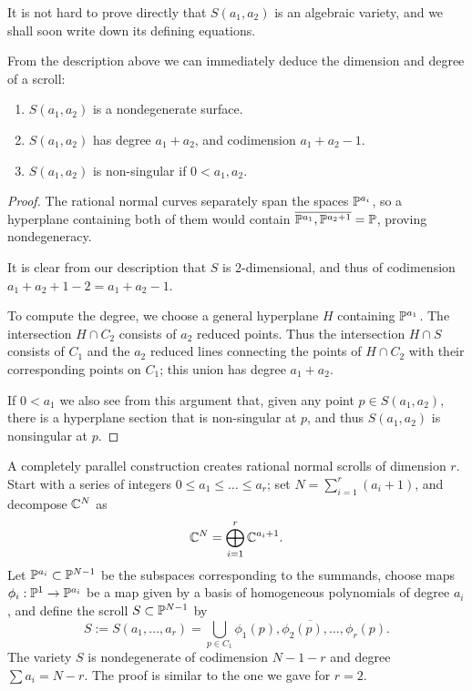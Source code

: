 It is not hard to prove directly that $S(a_1,a_2)$ is an algebraic variety, and we shall soon write down its defining equations.



From the description above we can immediately deduce the dimension and degree of a scroll:

\begin{proposition}
\begin{enumerate}
\item $S(a_1,a_2)$ is a nondegenerate surface.
 \item $S(a_1,a_2)$ has degree $a_1+a_2$, and codimension $a_1+a_2-1.$
 \item $S(a_{1},a_{2})$ is non-singular if $0<a_{1}, a_{2}$.
 \end{enumerate}
\end{proposition}\label{deg and codim}

\begin{proof}
 The rational normal curves separately span the spaces ${\mathbb P}^{a_i}$, so a hyperplane containing both of them would contain $\overline{{\mathbb P}^{a_1}, {\mathbb P}^{a_{2}+1}} = {\mathbb P}$, proving nondegeneracy. 
 
 It is clear from our description that $S$ is 2-dimensional, and thus of
codimension $a_{1}+a_{2}+1 -2 = a_{1}+a_{2}-1$. 

To compute the degree, we choose a general hyperplane $H$ containing ${\mathbb P}^{a_{1}}$. The intersection $H\cap C_{2}$ consists of $a_{2}$ reduced points. Thus the intersection $H\cap S$ consists of $C_{1}$ and the $a_{2}$ reduced lines connecting 
the points of $H\cap C_{2}$ with their corresponding points on $C_{1}$; this union has degree $a_{1}+a_{2}$.

If $0< a_{1}$ we also see from this argument that, given any point  $p\in S(a_{1},a_{2})$, there is
a hyperplane section that is non-singular at $p$, and thus $S(a_{1},a_{2})$ is nonsingular at $p$.
\end{proof}

A completely parallel construction creates rational normal scrolls of dimension $r$. Start with a series of integers $0 \leq a_1 \leq \dots \leq a_r$;
set $N = \sum_{i=1}^{r}(a_{i}+1)$,  and
decompose ${\mathbb C}^{N}$ as
$$
{\mathbb C}^{N} = \bigoplus_{i=1}^{r}{\mathbb C}^{a_{i}+1}.
$$
Let ${\mathbb P}^{a_{i}}\subset {\mathbb P}^{N-1}$ be the subspaces corresponding to the summands,  choose
maps $\phi_i : {\mathbb P}^1 \to {\mathbb P}^{a_{i}}$ be a map given by a basis of homogeneous polynomials of degree $a_i$, and define the scroll $S \subset {\mathbb P}^{N-1}$ by
$$
S:=S(a_{1}, \dots, a_{r}) = \bigcup_{p\in C_{1}}\overline{\phi_1(p), \phi_{2}(p), \dots, \phi_{r}(p)}.
$$
The variety $S$ is nondegenerate of codimension $N-1-r$ and degree $\sum a_{i} = N-r$. The proof is similar to the one we gave for $r=2$.

